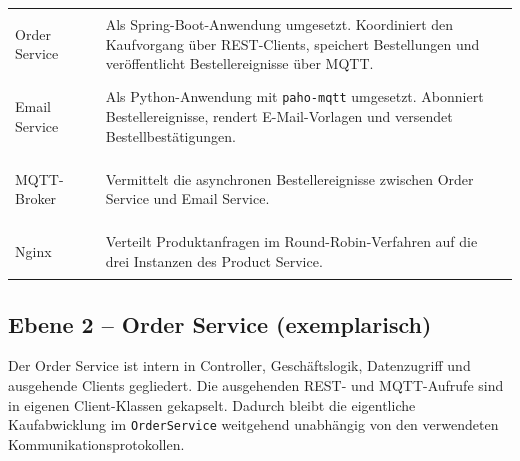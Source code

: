 {\begin{longtable}{@{}
            >{\bfseries\raggedright\arraybackslash}p{0.18\linewidth}
            >{\raggedright\arraybackslash}p{0.82\linewidth}
        @{}}
        \rowcolor{tableRowColor}
        Order Service &
        Als Spring-Boot-Anwendung umgesetzt. Koordiniert den Kaufvorgang über
        REST-Clients, speichert Bestellungen und veröffentlicht
        Bestellereignisse über MQTT. \\

        Email Service &
        Als Python-Anwendung mit \texttt{paho-mqtt} umgesetzt. Abonniert
        Bestellereignisse, rendert E-Mail-Vorlagen und versendet
        Bestellbestätigungen. \\

        \rowcolor{tableRowColor}
        MQTT-Broker &
        Vermittelt die asynchronen Bestellereignisse zwischen Order Service
        und Email Service. \\

        Nginx &
        Verteilt Produktanfragen im Round-Robin-Verfahren auf die drei
        Instanzen des Product Service. \\

    \end{longtable}
}

\subsection{Ebene 2 -- Order Service (exemplarisch)}

Der Order Service ist intern in Controller, Geschäftslogik,
Datenzugriff und ausgehende Clients gegliedert.
Die ausgehenden REST- und MQTT-Aufrufe sind in eigenen Client-Klassen gekapselt.
Dadurch bleibt die eigentliche Kaufabwicklung im \texttt{OrderService} weitgehend unabhängig von den verwendeten Kommunikationsprotokollen.

